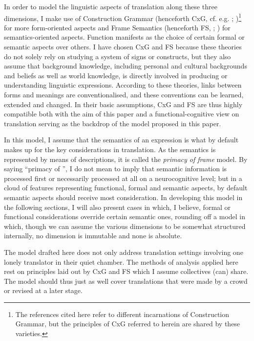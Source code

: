 \documentclass[output=paper]{LSP/langsci}
\begin{document}
In order to model the linguistic aspects of translation along these three dimensions, I make use of Construction Grammar (henceforth CxG, cf. e.g. \citealt{Fillmore1985Syntactic}; \citealt{Goldberg1995})\footnote{The references cited here refer to different incarnations of Construction Grammar, but the principles of CxG referred to herein are shared by these varieties.} for more form-oriented aspects and Frame Semantics (henceforth FS, \citealt{Fillmore1982}; \citealt{Fillmore1985Frames}) for semantics-oriented aspects. Function manifests as the choice of certain formal or semantic aspects over others. I have chosen CxG and FS because these theories do not solely rely on studying a system of signs or constructs, but they also assume that background knowledge, including personal and cultural backgrounds and beliefs as well as world knowledge, is directly involved in producing or understanding linguistic expressions. According to these theories, links between forms and meanings are conventionalised, and these conventions can be learned, extended and changed. In their basic assumptions, CxG and FS are thus highly compatible both with the aim of this paper and a functional-cognitive view on translation serving as the backdrop of the model proposed in this paper.

In this model, I assume that the semantics of an expression is what by default makes up for the key considerations in translation. As the semantics is represented by means of  descriptions, it is called the \textit{primacy of frame} model. By saying ``primacy of '', I do not mean to imply that semantic information is processed first or necessarily processed at all on a neurocognitive level; but in a cloud of features representing functional, formal and semantic aspects, by default semantic aspects should receive most consideration. In developing this model in the following sections, I will also present cases in which, I believe, formal or functional considerations override certain semantic ones, rounding off a model in which, though we can assume the various dimensions to be somewhat structured internally, no dimension is immutable and none is absolute.

The model drafted here does not only address translation settings involving one lonely translator in their quiet chamber. The methods of analysis applied here rest on principles laid out by CxG and FS which I assume collectives (can) share. The model should thus just as well cover translations that were made by a crowd or revised at a later stage.
\end{document}
